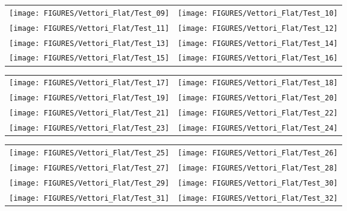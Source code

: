 \begin{figure}[p]
\begin{tabular*}{\textwidth}{l@{\extracolsep{\fill}}r}
\texttt{[image: FIGURES/Vettori\_Flat/Test\_09]} &
\texttt{[image: FIGURES/Vettori\_Flat/Test\_10]} \\
\texttt{[image: FIGURES/Vettori\_Flat/Test\_11]} &
\texttt{[image: FIGURES/Vettori\_Flat/Test\_12]} \\
\texttt{[image: FIGURES/Vettori\_Flat/Test\_13]} &
\texttt{[image: FIGURES/Vettori\_Flat/Test\_14]} \\
\texttt{[image: FIGURES/Vettori\_Flat/Test\_15]} &
\texttt{[image: FIGURES/Vettori\_Flat/Test\_16]} \\
\end{tabular*}
\label{Vettori_2}
\end{figure}

\begin{figure}[p]
\begin{tabular*}{\textwidth}{l@{\extracolsep{\fill}}r}
\texttt{[image: FIGURES/Vettori\_Flat/Test\_17]} &
\texttt{[image: FIGURES/Vettori\_Flat/Test\_18]} \\
\texttt{[image: FIGURES/Vettori\_Flat/Test\_19]} &
\texttt{[image: FIGURES/Vettori\_Flat/Test\_20]} \\
\texttt{[image: FIGURES/Vettori\_Flat/Test\_21]} &
\texttt{[image: FIGURES/Vettori\_Flat/Test\_22]} \\
\texttt{[image: FIGURES/Vettori\_Flat/Test\_23]} &
\texttt{[image: FIGURES/Vettori\_Flat/Test\_24]} \\
\end{tabular*}
\label{Vettori_3}
\end{figure}

\begin{figure}[p]
\begin{tabular*}{\textwidth}{l@{\extracolsep{\fill}}r}
\texttt{[image: FIGURES/Vettori\_Flat/Test\_25]} &
\texttt{[image: FIGURES/Vettori\_Flat/Test\_26]} \\
\texttt{[image: FIGURES/Vettori\_Flat/Test\_27]} &
\texttt{[image: FIGURES/Vettori\_Flat/Test\_28]} \\
\texttt{[image: FIGURES/Vettori\_Flat/Test\_29]} &
\texttt{[image: FIGURES/Vettori\_Flat/Test\_30]} \\
\texttt{[image: FIGURES/Vettori\_Flat/Test\_31]} &
\texttt{[image: FIGURES/Vettori\_Flat/Test\_32]} \\
\end{tabular*}
\label{Vettori_4}
\end{figure}

